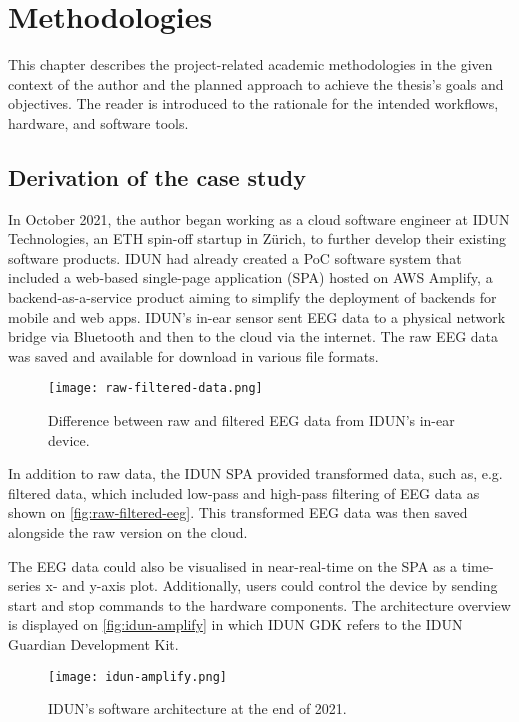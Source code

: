 \chapter{Methodologies}
\graphicspath{{Chapter3/Figs/}{Chapter3/Figs/}}

This chapter describes the project-related academic methodologies in the given context of the author and the planned approach to achieve the thesis's goals and objectives. The reader is introduced to the rationale for the intended workflows, hardware, and software tools.

\section{Derivation of the case study}
\label{chapter3-derivation-of-the-case-study}

In October 2021, the author began working as a cloud software engineer at IDUN Technologies, an ETH spin-off startup in Zürich, to further develop their existing software products. IDUN had already created a PoC software system that included a web-based single-page application (SPA) hosted on AWS Amplify, a backend-as-a-service product aiming to simplify the deployment of backends for mobile and web apps. IDUN's in-ear sensor sent EEG data to a physical network bridge via Bluetooth and then to the cloud via the internet. The raw EEG data was saved and available for download in various file formats.

\begin{figure}[!ht]
  \centering
  \texttt{[image: raw-filtered-data.png]}
  \caption{Difference between raw and filtered EEG data from IDUN's in-ear device.}
  \label{fig:raw-filtered-eeg}
\end{figure}

In addition to raw data, the IDUN SPA provided transformed data, such as, e.g. filtered data, which included low-pass and high-pass filtering of EEG data as shown on \autoref{fig:raw-filtered-eeg}. This transformed EEG data was then saved alongside the raw version on the cloud.

The EEG data could also be visualised in near-real-time on the SPA as a time-series x- and y-axis plot. Additionally, users could control the device by sending start and stop commands to the hardware components. The architecture overview is displayed on \autoref{fig:idun-amplify} in which IDUN GDK refers to the IDUN Guardian Development Kit.

\begin{figure}[!ht]
  \centering
  \texttt{[image: idun-amplify.png]}
  \caption{IDUN's software architecture at the end of 2021.}
  \label{fig:idun-amplify}
\end{figure}

